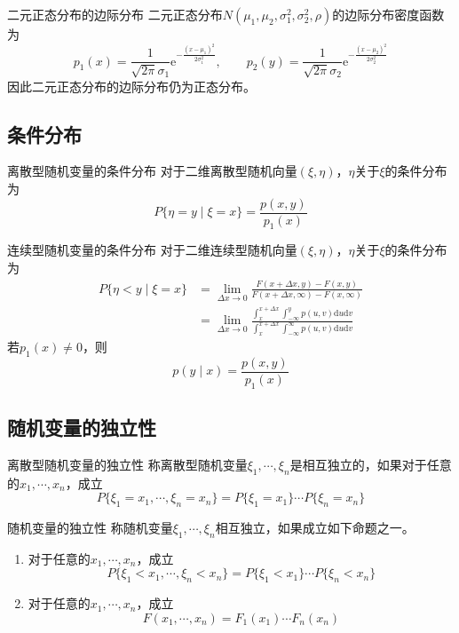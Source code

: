 \documentclass[lang = cn, scheme = chinese, thmcnt = section]{elegantbook}
\newcommand{\dis}{\displaystyle}
\begin{document}
\begin{definition}{二元正态分布的边际分布}
	二元正态分布$N(\mu_1,\mu_2,\sigma_1^2,\sigma_2^2,\rho)$的边际分布密度函数为
	$$
	p_1(x)=\frac{1}{\sqrt{2\pi}\sigma_1}\mathrm{e}^{-\frac{(x-\mu_1)^2}{2\sigma_1^2}},\qquad 
	p_2(y)=\frac{1}{\sqrt{2\pi}\sigma_2}\mathrm{e}^{-\frac{(x-\mu_2)^2}{2\sigma_2^2}}
	$$
	因此二元正态分布的边际分布仍为正态分布。
\end{definition}

\subsection{条件分布}

\begin{definition}{离散型随机变量的条件分布}
	对于二维离散型随机向量$(\xi,\eta)$，$\eta$关于$\xi$的条件分布为%
	$$
	P\{\eta=y \mid \xi=x\}=\frac{p(x,y)}{p_1(x)}
	$$
\end{definition}

\begin{definition}{连续型随机变量的条件分布}
	对于二维连续型随机向量$(\xi,\eta)$，$\eta$关于$\xi$的条件分布为%
	\begin{align*}
		P\{\eta<y \mid \xi=x\}
		&=\lim_{\Delta x\to 0}{\frac{F(x+\Delta x,y)-F(x,y)}{F(x+\Delta x,\infty)-F(x,\infty)}}\\
		&=\lim_{\Delta x\to 0}{\frac{\dis\int_{x}^{x+\Delta x}{\dis\int_{-\infty}^{y}{p(u,v)\mathrm{d}u\mathrm{d}v}}}{\int_{x}^{x+\Delta x}{\dis\int_{-\infty}^{\infty}{p(u,v)\mathrm{d}u\mathrm{d}v}}}}
	\end{align*}
	若$p_1(x)\ne 0$，则
	$$
	p(y \mid x)=\frac{p(x,y)}{p_1(x)}
	$$
\end{definition}

\subsection{随机变量的独立性}

\begin{definition}{离散型随机变量的独立性}
	称离散型随机变量$\xi_1,\cdots,\xi_n$是相互独立的，如果对于任意的$x_1,\cdots,x_n$，成立
	$$
	P\{\xi_1=x_1,\cdots,\xi_n=x_n\}=P\{\xi_1=x_1\}\cdots P\{\xi_n=x_n\}
	$$
\end{definition}

\begin{definition}{随机变量的独立性}
	称随机变量$\xi_1,\cdots,\xi_n$相互独立，如果成立如下命题之一。
	\begin{enumerate}
		\item 对于任意的$x_1,\cdots,x_n$，成立
		$$
		P\{\xi_1<x_1,\cdots,\xi_n<x_n\}=P\{\xi_1<x_1\}\cdots P\{\xi_n<x_n\}
		$$
		\item 对于任意的$x_1,\cdots,x_n$，成立%
		$$
		F(x_1,\cdots,x_n)=F_1(x_1)\cdots F_n(x_n)
		$$
	\end{enumerate}
\end{definition}
\end{document}
